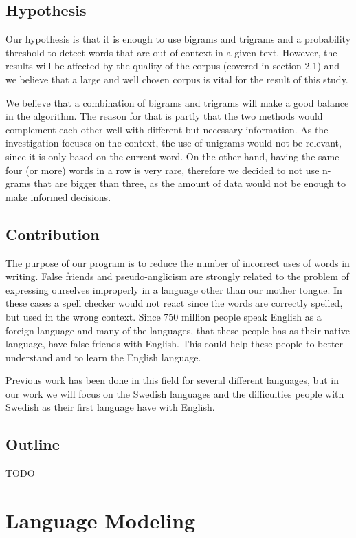 \documentclass[a4paper,12pt]{article}
\begin{document}
\subsection{Hypothesis}
Our hypothesis is that it is enough to use bigrams and trigrams and a probability threshold to detect words that are out of context in a given text. However, the results will be affected by the quality of the corpus (covered in section 2.1) and we believe that a large and well chosen corpus is vital for the result of this study.

We believe that a combination of bigrams and trigrams will make a good balance in the algorithm. The reason for that is partly that the two methods would complement each other well with different but necessary information. As the investigation focuses on the context, the use of unigrams would not be relevant, since it is only based on the current word. On the other hand, having the same four (or more) words in a row is very rare, therefore we decided to not use n-grams that are bigger than three, as the amount of data would not be enough to make informed decisions.

\subsection{Contribution}
\label{sec:contribution}
The purpose of our program is to reduce the number of incorrect uses of  words in writing. False friends and pseudo-anglicism are strongly related to the problem of expressing ourselves improperly in a language other than our mother tongue. In these cases a spell checker would not react since the words are correctly spelled, but used in the wrong context. Since 750 million people speak English as a foreign language and many of the languages, that these people has as their native language, have false friends with English. This could help these people to better understand and to learn the English language. 

Previous work has been done in this field for several different languages, but in our work we will focus on the Swedish languages and the difficulties people with Swedish as their first language have with English.

\subsection{Outline}
\label{sec:outline}
TODO

\section{Language Modeling}
\end{document}
